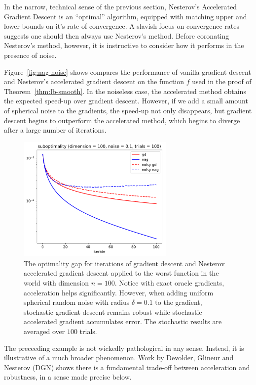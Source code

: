 In the narrow, technical sense of the previous section, Nesterov's Accelerated Gradient 
Descent is an ``optimal'' algorithm, equipped with matching upper and lower bounds on 
it's rate of convergence. A slavish focus on convergence rates suggests one should then
always use Nesterov's method. Before coronating Nesterov's method, however, it
is instructive to consider how it performs in the presence of noise.

Figure~\eqref{fig:nag-noise} shows compares the performance of vanilla gradient
descent and Nesterov's accelerated gradient descent on the function $f$ used in
the proof of Theorem~\eqref{thm:lb-smooth}. In the noiseless case, the
accelerated method obtains the expected speed-up over gradient descent. However,
if we add a small amount of spherical noise to the gradients, the speed-up not
only disappears, but gradient descent begins to outperform the accelerated
method, which begins to diverge after a large number of iterations.

\begin{figure}
\begin{center}
\includegraphics[width=3in]{figures/nag-noise.pdf}
\end{center}
\caption{The optimality gap for iterations of gradient descent and Nesterov accelerated gradient descent applied to the worst function in the world with dimension $n=100$. Notice with exact oracle gradients, acceleration helps significantly. However, when adding uniform spherical random noise with radius $\delta=0.1$ to the gradient, stochastic gradient descent remains robust while stochastic accelerated gradient accumulates error. The stochastic results are averaged over $100$ trials.}
\label{fig:nag-noise}
\end{figure}

The preceeding example is not wickedly pathological in any sense. Instead, it is
illustrative of a much broader phenomenon. Work by Devolder, Glineur and
Nesterov (DGN) \cite{devolder2014first} shows there is a
fundamental trade-off between acceleration and robustness, in a sense
made precise below. 

